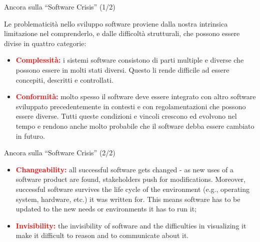 \documentclass{beamer}
\begin{document}
\begin{frame}{\centerline{Ancora sulla ``Software Crisis'' (1/2)}}
Le problematicit\`{a} nello sviluppo software proviene dalla nostra intrinsica limitazione nel comprenderlo, e dalle difficolt\`{a} strutturali, che possono essere divise in quattro categorie:
\begin{itemize}
\item \textcolor{red}{\bf Complessit\`{a}:} i sistemi software consistono di parti multiple e diverse che possono essere in molti stati diversi. Questo li rende difficile ad essere concepiti, descritti e controllati.

\item \textcolor{red}{\bf Conformit\`{a}:} molto spesso il software deve essere integrato con altro software sviluppato precedentemente in contesti e con regolamentazioni che possono essere diverse. Tutti queste condizioni e vincoli crescono ed evolvono nel tempo e rendono anche molto probabile che il software debba essere cambiato in futuro.
\end{itemize}

\end{frame}

\begin{frame}{\centerline{Ancora sulla ``Software Crisis'' (2/2)}}
\begin{itemize}
\item \textcolor{red}{\bf Changeability:} all successful software gets changed - as new uses of a software product are found, stakeholders push for modifications. Moreover, successful software survives the life cycle of the environment (e.g., operating system, hardware, etc.) it was written for. This means software has to be updated to the new needs or environments it has to run it;

\item \textcolor{red}{\bf Invisibility:} the invisibility of software and the difficulties in visualizing it make it difficult to reason and to communicate about it.
\end{itemize}
\end{frame}
\end{document}
